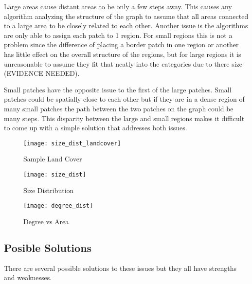 \documentclass[conference]{IEEEtran}
\begin{document}
	Large areas cause distant areas to be only a few steps away. This causes any algorithm analyzing the structure of the graph to assume that all areas connected to a large area to be closely related to each other. Another issue is the algorithms are only able to assign each patch to 1 region. For small regions this is not a problem since the difference of placing a border patch in one region or another has little effect on the overall structure of the regions, but for large regions it is unreasonable to assume they fit that neatly into the categories due to there size (EVIDENCE NEEDED).
	
	Small patches have the opposite issue to the first of the large patches. Small patches could be spatially close to each other but if they are in a dense region of many small patches the path between the two patches on the graph could be many steps. This disparity between the large and small regions makes it difficult to come up with a simple solution that addresses both issues.
	
	\begin{figure*}[t!]
		\centering
		\begin{subfigure}[b]{0.4\textwidth}
			\centering
			\texttt{[image: size\_dist\_landcover]}
			\caption{Sample Land Cover}
			\label{simple_land_cover}
		\end{subfigure}
		\hfill
		\begin{subfigure}[b]{0.45\textwidth}
			\centering
			\texttt{[image: size\_dist]}
			\caption{Size Distribution}
			\label{size_distribution}
		\end{subfigure}
		\begin{subfigure}[b]{0.45\textwidth}
			\centering
			\texttt{[image: degree\_dist]}
			\caption{Degree vs Area}
			\label{degree_vs_area}
		\end{subfigure}
		\caption{This figure shows the distribution of patch sizes as well as the relationship between area and degree of the patches from a random section of landcover. In \ref{size_distribution} this example 80\% of the patches have an area of 9 pixels or less while the range of sizes is 1 to 52686 pixels.}
		\label{size_distribution_example}
	\end{figure*}
	
	\subsection{Posible Solutions}
	There are several possible solutions to these issues but they all have strengths and weaknesses. 
	
\end{document}
